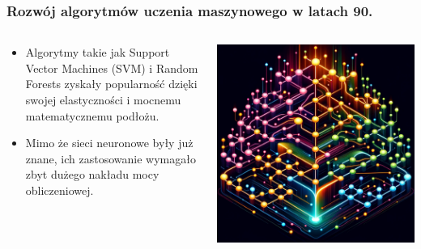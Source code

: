 \documentclass[smaller]{beamer}
\begin{document}
\begin{frame}
\frametitle{Rozwój algorytmów uczenia maszynowego w latach 90.}

\begin{columns}
    \begin{column}{0.6\textwidth}
        \begin{itemize}
            \item Algorytmy takie jak Support Vector Machines (SVM) i Random Forests zyskały popularność dzięki swojej elastyczności i mocnemu matematycznemu podłożu.
            \item Mimo że sieci neuronowe były już znane, ich zastosowanie wymagało zbyt dużego nakładu mocy obliczeniowej.
        \end{itemize}
    \end{column}

    \begin{column}{0.4\textwidth}
        \includegraphics[width=\textwidth]{../manifest/random-forest.png}
    \end{column}
\end{columns}
\end{frame}

\end{document}
